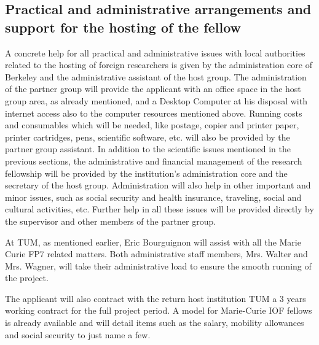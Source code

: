 \subsection{Practical and administrative arrangements and support for the hosting of the fellow 
} 
A concrete help for all practical and administrative issues with local authorities related to 
the hosting of foreign researchers is given by the administration core of Berkeley and the 
administrative assistant of the host group. The administration of the partner group will 
provide the applicant with an office space in the host group area, as already mentioned, 
and a Desktop Computer at his disposal with internet access also to the computer 
resources mentioned above. Running costs and consumables which will be needed, like 
postage, copier and printer paper, printer cartridges, pens, scientific software, etc. will 
also be provided by the partner group assistant. 
In addition to the scientific issues mentioned in the previous sections, the administrative 
and financial management of the research fellowship will be provided by the institution's 
administration core and the secretary of the host group. Administration will also help in 
other important and minor issues, such as social security and health insurance, traveling, 
social and cultural activities, etc. Further help in all these issues will be provided directly 
by the supervisor and other members of the partner group.

At TUM, as mentioned earlier, Eric Bourguignon  will assist with all the
Marie Curie FP7 related matters. Both  administrative staff members, Mrs. Walter and
Mrs. Wagner, will take their administrative load  to ensure the smooth running of the
project.

The applicant will also contract with the return host institution TUM a 3 years working 
contract for the full project period. A model for Marie-Curie IOF fellows is already available 
and will detail items such as the salary, mobility allowances and social security to just name a few.
\newpage
